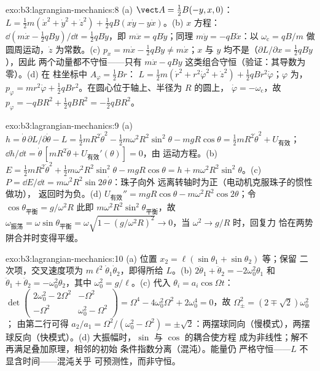 \begin{solution}{exo:b3:lagrangian-mechanics:8}
(a) $\vect A = \tfrac12 B(-y, x, 0)$：
$L = \tfrac12 m(\dot x^2 + \dot y^2 + \dot z^2) + \tfrac12 qB(x\dot y -
y\dot x)$。(b) $x$ 方程：$\dd(m\dot x - \tfrac12 qBy)/\dd t =
\tfrac12 qB\dot y$，即 $m\ddot x = qB\dot y$；同理 $m\ddot y =
-qB\dot x$：以 $\omega_{\text{c}} = qB/m$ 做圆周运动，$\dot z$
为常数。(c) $p_x = m\dot x - \tfrac12 qBy \neq m\dot x$；$x$ 与
$y$ 均不是（$\partial L/\partial x = \tfrac12 qB\dot y$），因此
两个动量都不守恒——只有 $m\dot x -
qBy$ 这类组合守恒（验证：其导数为零）。(d) 在
柱坐标中 $A_\varphi = \tfrac12 Br$：
$L = \tfrac12 m(\dot r^2 + r^2\dot\varphi^2 + \dot z^2) + \tfrac12
qBr^2\dot\varphi$；$\varphi$ 为，$p_\varphi = mr^2\dot\varphi +
\tfrac12 qBr^2$。在圆心位于轴上、半径为 $R$ 的圆上，
$\dot\varphi = -\omega_{\text{c}}$，故 $p_\varphi = -qBR^2 + \tfrac12
qBR^2 = -\tfrac12 qBR^2$。
\end{solution}

\begin{solution}{exo:b3:lagrangian-mechanics:9}
(a) $h = \dot\theta\,\partial L/\partial\dot\theta - L = \tfrac12
mR^2\dot\theta^2 - \tfrac12 m\omega^2R^2\sin^2\theta - mgR\cos\theta =
\tfrac12 mR^2\dot\theta^2 + U_{\text{有效}}$；$\dd h/\dd t =
\dot\theta\,[mR^2\ddot\theta + U_{\text{有效}}'(\theta)] = 0$，由
运动方程。(b) $E = \tfrac12 mR^2\dot\theta^2 + \tfrac12
m\omega^2R^2\sin^2\theta - mgR\cos\theta = h +
m\omega^2R^2\sin^2\theta$。(c) $P = \dd E/\dd t =
m\omega^2R^2\sin2\theta\,\dot\theta$：珠子向外
远离转轴时为正（电动机克服珠子的惯性做功），
返回时为负。(d) $U_{\text{有效}}'' = mgR\cos\theta -
m\omega^2R^2\cos2\theta$；令 $\cos\theta_{\text{平衡}} = g/\omega^2R$
此即 $m\omega^2R^2\sin^2\theta_{\text{平衡}}$，故
$\omega_{\text{振荡}} = \omega\sin\theta_{\text{平衡}} = \omega\sqrt{1 -
(g/\omega^2R)^2} \to 0$，当 $\omega^2 \to g/R$ 时，回复力
恰在两势阱合并时变得平缓。
\end{solution}

\begin{solution}{exo:b3:lagrangian-mechanics:10}
(a) 位置 $x_2 = \ell(\sin\theta_1 + \sin\theta_2)$ 等；保留
二次项，交叉速度项为
$m\ell^2\dot\theta_1\dot\theta_2$，即得所给 $L$。(b)
$2\ddot\theta_1 + \ddot\theta_2 = -2\omega_0^2\theta_1$ 和
$\ddot\theta_1 + \ddot\theta_2 = -\omega_0^2\theta_2$，其中 $\omega_0^2
= g/\ell$。(c) 代入 $\theta_i = a_i\cos\Omega t$：
$\det\begin{pmatrix} 2\omega_0^2 - 2\Omega^2 & -\Omega^2\\ -\Omega^2 &
\omega_0^2 - \Omega^2\end{pmatrix} = \Omega^4 - 4\omega_0^2\Omega^2 +
2\omega_0^4 = 0$，故 $\Omega_\pm^2 = (2 \mp \sqrt2)\omega_0^2$；
由第二行可得 $a_2/a_1 = \Omega^2/(\omega_0^2 - \Omega^2) =
\pm\sqrt2$：两摆球同向（慢模式），两摆球反向（快模式）。(d)
大振幅时，$\sin$ 与 $\cos$ 的耦合使方程
成为非线性；解不再满足叠加原理，相邻的初始
条件指数分离（混沌）。能量仍
严格守恒——$L$ 不显含时间——混沌关乎
可预测性，而非守恒。
\end{solution}


